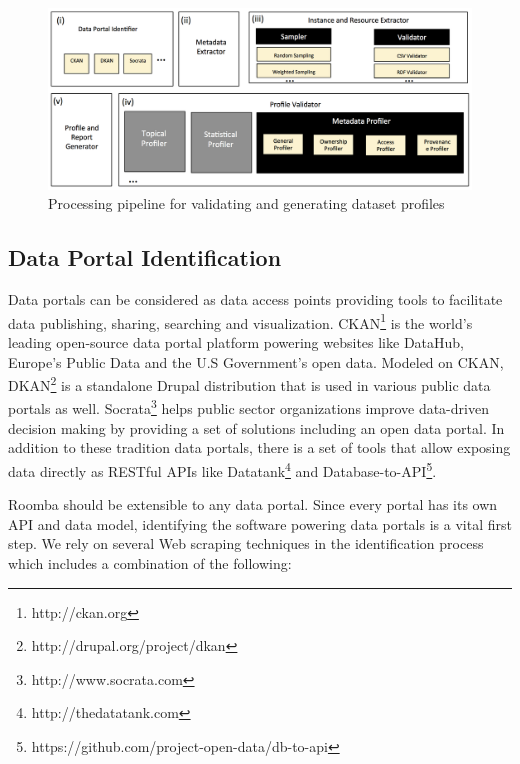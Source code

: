 \documentclass[runningheads,a4paper]{llncs}
\begin{document}
\begin{figure}[!ht]
  \centering
    \includegraphics[scale=0.4]{figure-1_architecture.png}
  \caption{Processing pipeline for validating and generating dataset profiles}
  \label{fig:1}
\end{figure}

\subsection{Data Portal Identification}

Data portals can be considered as data access points providing tools to facilitate data publishing, sharing, searching and visualization. CKAN\footnote{http://ckan.org} is the world's leading open-source data portal platform powering websites like DataHub, Europe's Public Data and the U.S Government's open data. Modeled on CKAN, DKAN\footnote{http://drupal.org/project/dkan} is a standalone Drupal distribution that is used in various public data portals as well. Socrata\footnote{http://www.socrata.com} helps public sector organizations improve data-driven decision making by providing a set of solutions including an open data portal. In addition to these tradition data portals, there is a set of tools that allow exposing data directly as RESTful APIs like Datatank\footnote{http://thedatatank.com} and Database-to-API\footnote{https://github.com/project-open-data/db-to-api}.

Roomba should be extensible to any data portal. Since every portal has its own API and data model, identifying the software powering data portals is a vital first step. We rely on several Web scraping techniques in the identification process which includes a combination of the following:
\end{document}
